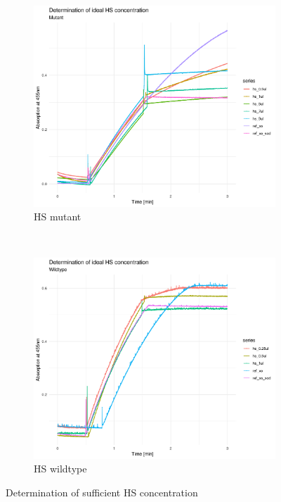 \begin{figure}
    \centering
    \begin{subfigure}{0.45\textwidth}
	\includegraphics[width=\textwidth]{img/activity_mut_hs.png}
	\caption{HS mutant}
	\label{fig:activity_mut_hs}
    \end{subfigure}
    ~
    \begin{subfigure}{0.45\textwidth}
	\includegraphics[width=\textwidth]{img/activity_wt_hs.png}
	\caption{HS wildtype}
	\label{fig:activity_wt_hs}
    \end{subfigure}
    \caption{Determination of sufficient HS concentration}
    \label{fig:activity_hs}
\end{figure}

